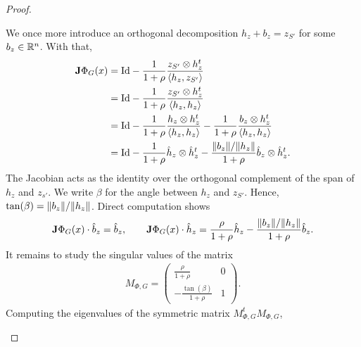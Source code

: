\documentclass[10pt,a4paper]{article}
\begin{document}
\begin{proof}
\begin{itemize}
        We once more introduce an orthogonal decomposition $h_{z} + b_{z} = z_{S'}$ for some $b_{z} \in {\mathbb R}^{n}$.
        With that,
        \begin{align*}
            {\mathbf{J}} \Phi_{G}(x)
            &=
            {\rm Id} 
            - 
            \frac{ 1 }{ 1 + \rho }  
            \frac{ z_{S'} \otimes h_{z}^{t} }{ \langle h_{z},z_{S'}\rangle }  
            \\
            &=
            {\rm Id} 
            - 
            \frac{ 1 }{ 1 + \rho }  
            \frac{ z_{S'} \otimes h_{z}^{t} }{ \langle h_{z},h_{z}\rangle }  
            \\
            &=
            {\rm Id} 
            - 
            \frac{ 1 }{ 1 + \rho }  
            \frac{ h_{z} \otimes h_{z}^{t} }{ \langle h_{z},h_{z}\rangle } 
            - 
            \frac{ 1 }{ 1 + \rho }  
            \frac{ b_{z} \otimes h_{z}^{t} }{ \langle h_{z},h_{z}\rangle } 
            \\
            &=
            {\rm Id} 
            - 
            \frac{ 1 }{ 1 + \rho }  
            \hat h_{z} \otimes \hat h_{z}^{t}
            - 
            \frac{ \|  b_{z}  \| / \|  h_{z}  \| }{ 1 + \rho }  
            \hat b_{z} \otimes \hat h_{z}^{t}
            .
        \end{align*}
        The Jacobian acts as the identity over the orthogonal complement of the span of $h_{z}$ and $z_{s'}$.
        We write $\beta$ for the angle between $h_{z}$ and $z_{S'}$.
        Hence, $\tan(\beta) = \|  b_{z}  \| / \|  h_{z}  \|$. 
        Direct computation shows 
        \begin{align}
            {\mathbf{J}} \Phi_{G}(x) \cdot \hat b_{z} = \hat b_{z}
            ,
            \qquad 
            {\mathbf{J}} \Phi_{G}(x) \cdot \hat h_{z} = \frac{ \rho }{ 1 + \rho } \hat h_{z} - \frac{ \|  b_{z}  \| / \|  h_{z}  \| }{ 1 + \rho } \hat b_{z}
            .
        \end{align}
        It remains to study the singular values of the matrix 
        \begin{align*}
            M_{\Phi,G} 
            = 
            \begin{pmatrix}
                 \frac{ \rho }{ 1 + \rho }    & 0 
                \\
                -\frac{ \tan(\beta) }{1+\rho} & 1 
            \end{pmatrix}
            .
        \end{align*}
        Computing the eigenvalues of the symmetric matrix $M_{\Phi,G}^{t} M_{\Phi,G}$,

\end{itemize}
\end{proof}
\end{document}
